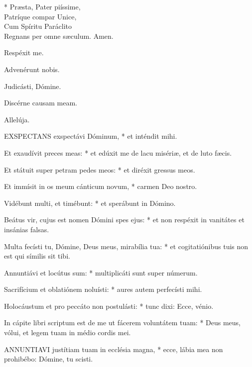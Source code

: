 * Præsta, Pater piíssime,\\
Patríque compar Unice,\\
Cum Spíritu Paráclito\\
Regnans per omne sæculum. Amen.

  Respéxit me.



 Advenérunt nobis.


 Judicásti, Dómine.


 Discérne causam meam.

  Allelúja.


\lettrine[lines=2]{E}{XSPECTANS} exspectávi Dóminum, * et inténdit mihi.

Et exaudívit preces meas: * et edúxit me de lacu misériæ, et de luto fæcis.

Et státuit super petram pedes meos: * et diréxit gressus meos.

Et immísit in os meum cánticum novum, * carmen Deo nostro.

Vidébunt multi, et timébunt: * et sperábunt in Dómino.

Beátus vir, cujus est nomen Dómini spes ejus: * et non respéxit in vanitátes et insánias falsas.

Multa fecísti tu, Dómine, Deus meus, mirabília tua: * et cogitatiónibus tuis non est qui símilis sit tibi.

Annuntiávi et locútus sum: * multiplicáti sunt super númerum.

Sacrifícium et oblatiónem noluísti: * aures autem perfecísti mihi.

Holocáustum et pro peccáto non postulásti: * tunc dixi: Ecce, vénio.

In cápite libri scriptum est de me ut fácerem voluntátem tuam: * Deus meus, vólui, et legem tuam in médio cordis mei.


\lettrine[lines=2]{A}{NNUNTIAVI} justítiam tuam in ecclésia magna, * ecce, lábia mea non prohibébo: Dómine, tu scisti.

